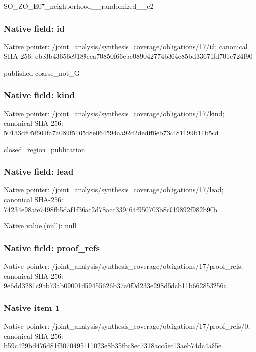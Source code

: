\documentclass[10pt,a4paper]{article}
\begin{document}
\begingroup\raggedright\sloppy SO\_\allowbreak{}ZO\_\allowbreak{}E07\_\allowbreak{}neighborhood\_\allowbreak{}\_\allowbreak{}randomized\_\allowbreak{}\_\allowbreak{}c2\par\endgroup

\subsubsection{Native field: id}
Native pointer: /joint\_\allowbreak{}analysis/synthesis\_\allowbreak{}coverage/obligations/17/id; canonical SHA-256: ebc3b43656c9189cca70850f66ebe089042774b364e85bd33671fd701c724f90

\begingroup\raggedright\sloppy published-coarse\_\allowbreak{}not\_\allowbreak{}G\par\endgroup

\subsubsection{Native field: kind}
Native pointer: /joint\_\allowbreak{}analysis/synthesis\_\allowbreak{}coverage/obligations/17/kind; canonical SHA-256: 50133df05f664fa7a089f5165d8e064594aa92d2dedff6eb73c481199b11b5cd

\begingroup\raggedright\sloppy closed\_\allowbreak{}region\_\allowbreak{}publication\par\endgroup

\subsubsection{Native field: lead}
Native pointer: /joint\_\allowbreak{}analysis/synthesis\_\allowbreak{}coverage/obligations/17/lead; canonical SHA-256: 74234e98afe7498fb5daf1f36ac2d78acc339464f950703b8c019892f982b90b

Native value (null): null

\subsubsection{Native field: proof\_\allowbreak{}refs}
Native pointer: /joint\_\allowbreak{}analysis/synthesis\_\allowbreak{}coverage/obligations/17/proof\_\allowbreak{}refs; canonical SHA-256: 9e6dd3281c9bb73ab09001d59455626b37a0f0d233e298d5dcb11b662853256c

\subsubsection{Native item 1}
Native pointer: /joint\_\allowbreak{}analysis/synthesis\_\allowbreak{}coverage/obligations/17/proof\_\allowbreak{}refs/0; canonical SHA-256: b59c429bd476d81f3070495111023e8b35fbc8ec7318acc5ec13aeb74dc4a85e
\end{document}
